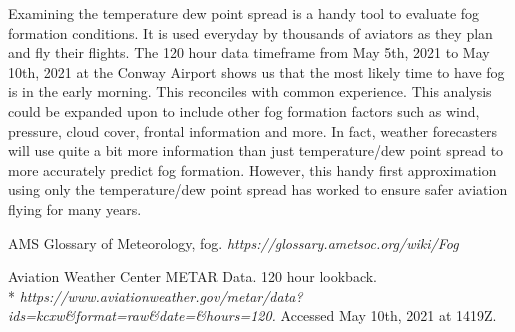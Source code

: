 \documentclass{article}
\begin{document}
Examining the temperature dew point spread is a handy tool to evaluate fog formation conditions. It is used everyday by thousands of aviators as they plan and fly their flights. The 120 hour data timeframe from May 5th, 2021 to May 10th, 2021 at the Conway Airport shows us that the most likely time to have fog is in the early morning. This reconciles with common experience. This analysis could be expanded upon to include other fog formation factors such as wind, pressure, cloud cover, frontal information and more. In fact, weather forecasters will use quite a bit more information than just temperature/dew point spread to more accurately predict fog formation. However, this handy first approximation using only the temperature/dew point spread has worked to ensure safer aviation flying for many years.
\begin{thebibliography}{2}
AMS Glossary of Meteorology, fog.
\textit{https://glossary.ametsoc.org/wiki/Fog}

Aviation Weather Center METAR Data. 120 hour lookback.  
\\*
\textit{https://www.aviationweather.gov/metar/data?ids=kcxw\&format=raw\&date=\&hours=120.} 
Accessed May 10th, 2021 at 1419Z.

\end{thebibliography}
\end{document}
